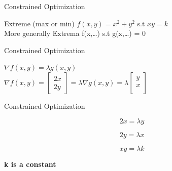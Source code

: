 \documentclass{beamer}
\begin{document}
    
    
    


\begin{frame}{Constrained Optimization}
    
    Extreme (max or min) $f(x,y) = x^{2}+y^{2}$ s.t $xy=k$\\
    
    \vspace{5em}
    More generally Extrema f(x,\dots) s.t g(x,\dots) = 0
    
\end{frame}

\begin{frame}{Constrained Optimization}
    
    $\nabla f(x,y) = \lambda g(x,y)$\\
    $\nabla f(x,y) = \begin{bmatrix}
    2x\\
    2y
    \end{bmatrix}
    = \lambda \nabla g(x,y)  = \lambda \begin{bmatrix}
    y\\
    x\\
    \end{bmatrix}$
\end{frame}

\begin{frame}{Constrained Optimization}
    
    \begin{equation}
            2x = \lambda y
    \end{equation}
    
    
    \begin{equation}
            2y = \lambda x
    \end{equation}
    
    
    \begin{equation}
            xy = \lambda k
    \end{equation}
    
    \textbf{k is a constant}
\end{frame}
\end{document}
